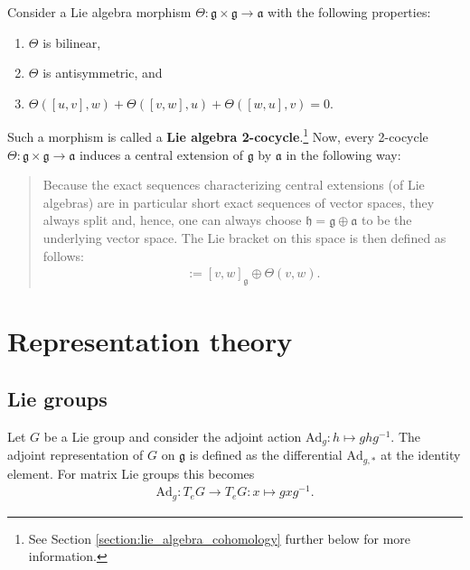     \begin{construct}\label{lie:cocycle}
        Consider a Lie algebra morphism $\Theta:\mathfrak{g}\times\mathfrak{g}\rightarrow\mathfrak{a}$ with the following properties:
        \begin{enumerate}
            \item $\Theta$ is bilinear,
            \item $\Theta$ is antisymmetric, and
            \item $\Theta([u,v],w) + \Theta([v,w],u) + \Theta([w,u],v) = 0$.
        \end{enumerate}
        Such a morphism is called a \textbf{Lie algebra 2-cocycle}.\footnote{See Section \ref{section:lie_algebra_cohomology} further below for more information.} Now, every 2-cocycle $\Theta:\mathfrak{g}\times\mathfrak{g}\rightarrow\mathfrak{a}$ induces a central extension of $\mathfrak{g}$ by $\mathfrak{a}$ in the following way:
        \begin{quote}
            Because the exact sequences characterizing central extensions (of Lie algebras) are in particular short exact sequences of vector spaces, they always split and, hence, one can always choose $\mathfrak{h}=\mathfrak{g}\oplus\mathfrak{a}$ to be the underlying vector space. The Lie bracket on this space is then defined as follows:
            \begin{gather}
                [v\oplus\lambda,w\oplus\mu] := [v,w]_{\mathfrak{g}}\oplus\Theta(v,w).
            \end{gather}
        \end{quote}
    \end{construct}

\section{Representation theory}
\subsection{Lie groups}


    \begin{example}\label{lie:adjoint_representation}
        Let $G$ be a Lie group and consider the adjoint action $\mathrm{Ad}_g:h\mapsto ghg^{-1}$. The adjoint representation of $G$ on $\mathfrak{g}$ is defined as the differential $\mathrm{Ad}_{g,*}$ at the identity element. For matrix Lie groups this becomes
        \begin{gather}
            \mathrm{Ad}_g:T_eG\rightarrow T_eG:x\mapsto gxg^{-1}.
        \end{gather}
    \end{example}

